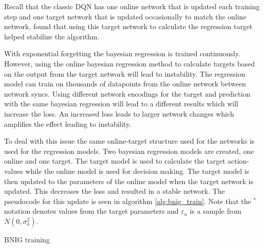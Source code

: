 Recall that the classic DQN has one online network that is updated each training step and one target network that is updated occasionally to match the online network. \cite{mnih_2013} found that using this target network to calculate the regression target helped stabilize the algorithm.

With exponential forgetting the bayesian regression is trained continuously. However, using the online bayesian regression method to calculate targets based on the output from the target network will lead to instability. The regression model can train on thousands of datapoints from the online network between network syncs. Using different network encodings for the target and prediction with the same bayesian regression will lead to a different results which will increase the loss. An increased loss leads to larger network changes which amplifies the effect leading to instability.

To deal with this issue the same online-target structure used for the networks is used for the regression models. Two bayesian regression models are created, one online and one target. The target model is used to calculate the target action-values while the online model is used for decision making. The target model is then updated to the parameters of the online model when the target network is updated. This decreases the loss and resulted in a stable network. The pseudocode for this update is seen in algorithm \ref{alg:bnig_train}. Note that the $^*$ notation denotes values from the target parameters and $\varepsilon_a$ is a sample from $N(0,\sigma^2_a)$.

\begin{algorithm}[H]
    \caption{BNIG training}
    \label{alg:bnig_train}
\end{algorithm}

